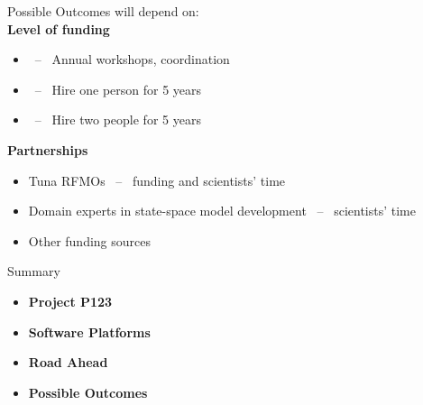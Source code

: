 \documentclass[aspectratio=169]{beamer}
\begin{document}
\begin{frame}{Possible Outcomes}\small
  will depend on:\\[3ex]
  \textbf{Level of funding}
  \begin{itemize}
    \item[]  ~--~ Annual workshops, coordination\\[-1ex]
    \item[]  ~--~ Hire one person for 5 years\\[-1ex]
    \item[]  ~--~ Hire two people for 5 years\\[5ex]
  \end{itemize}
  \textbf{Partnerships}
  \begin{itemize}
    \item[] Tuna RFMOs ~--~ funding and scientists' time\\[-1ex]
    \item[] Domain experts in state-space model development ~--~ scientists'
    time\\[-1ex]
    \item[] Other funding sources\\[1ex]
  \end{itemize}
\end{frame}


\begin{frame}{Summary}
  \begin{itemize}
    \item[] {\bf\darkblue Project P123} \\[5ex]
    \item[] {\bf\darkblue Software Platforms} \\[5ex]
    \item[] {\bf\darkblue Road Ahead} \\[5ex]
    \item[] {\bf\darkblue Possible Outcomes} \\[1ex]
  \end{itemize}
\end{frame}
\end{document}
